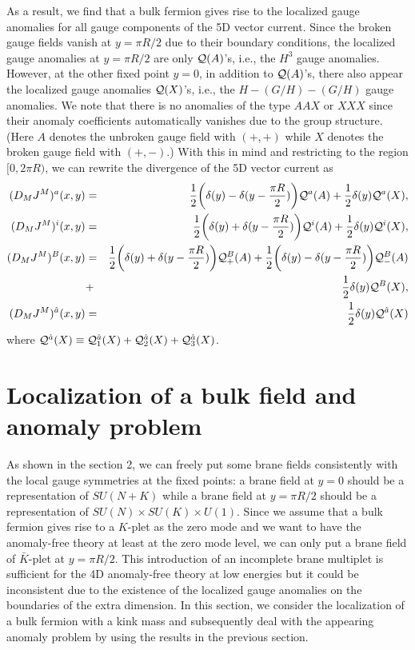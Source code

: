 \documentclass[a4paper,12pt]{article}
\begin{document}
As a result, we find that a bulk fermion gives rise to the localized gauge 
anomalies for all gauge components of the 5D vector current.  
Since the broken gauge fields vanish at $y=\pi R/2$ due to their
boundary conditions, the localized gauge anomalies 
at $y=\pi R/2$ are only ${\cal Q}(A)$'s, i.e., the $H^3$ gauge anomalies. 
However, at the other fixed point $y=0$, in addition to ${\cal Q}(A)$'s, 
there also appear the localized gauge 
anomalies ${\cal Q}(X)$'s, i.e., the $H-(G/H)-(G/H)$ gauge anomalies.  
We note that there is no anomalies of the type $AAX$ or $XXX$ 
since their anomaly coefficients automatically vanishes due to the group 
structure.(Here $A$ denotes the unbroken gauge field with $(+,+)$ 
while $X$ denotes the broken gauge field with $(+,-)$.)
With this in mind and restricting to the region $[0,2\pi R)$, 
we can rewrite the divergence of the 5D vector current as
\begin{eqnarray}
(D_M J^{M})^a(x,y)&=&\frac{1}{2}\bigg(\delta(y)-\delta(y-\frac{\pi R}{2})\bigg)
{\cal Q}^a(A) 
+\frac{1}{2}\delta(y){\cal Q}^a(X), \label{am1}\\
(D_M J^{M})^i(x,y)&=&\frac{1}{2}\bigg(\delta(y)+\delta(y-\frac{\pi R}{2})\bigg)
{\cal Q}^i(A) 
+\frac{1}{2}\delta(y){\cal Q}^i(X), \label{am2}\\
(D_M J^{M})^B(x,y)&=&\frac{1}{2}\bigg(\delta(y)+\delta(y-\frac{\pi R}{2})\bigg)
{\cal Q}^B_+(A)
+\frac{1}{2}\bigg(\delta(y)-\delta(y-\frac{\pi R}{2})\bigg){\cal Q}^B_-(A)
\nonumber \\
&+&\frac{1}{2}\delta(y){\cal Q}^B(X),\label{am3}\\
(D_M J^{M})^{\hat a}(x,y)&=&\frac{1}{2}\delta(y) {\cal Q}^{\hat a}(X)\label{am4}
\end{eqnarray} 
where ${\cal Q}^{\hat a}(X)\equiv 
{\cal Q}^{\hat a}_1(X)+{\cal Q}^{\hat a}_2(X)+{\cal Q}^{\hat a}_3(X)$.




\section{Localization of a bulk field and anomaly problem}

As shown in the section 2, we can freely put some brane fields  
consistently with the local gauge symmetries at the fixed points: 
a brane field at $y=0$ should be a representation of $SU(N+K)$ while
a brane field at $y=\pi R/2$ should be a representation 
of $SU(N)\times SU(K)\times U(1)$. Since we assume that a bulk fermion gives 
rise to a $K$-plet as the zero mode and we want to have 
the anomaly-free theory at least at the zero mode level, 
we can only put a brane field of $\bar K$-plet at $y=\pi R/2$. 
This introduction of an incomplete brane multiplet is
sufficient for the 4D anomaly-free theory at low energies but it could be 
inconsistent due to the existence of the localized gauge anomalies 
on the boundaries of the extra dimension. In this section, we consider
the localization of a bulk fermion with a kink mass and subsequently deal 
with the appearing anomaly problem by using the results in the previous 
section. 
\end{document}
